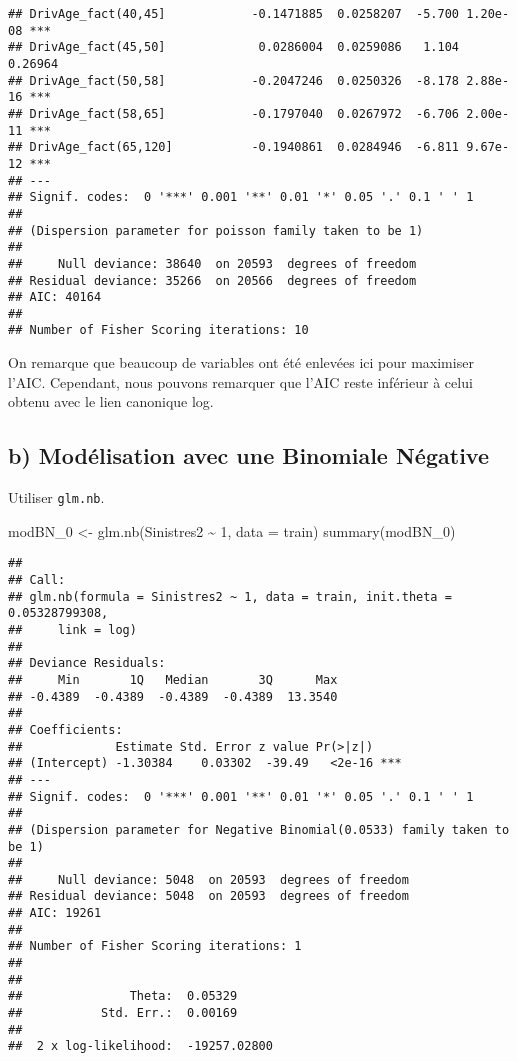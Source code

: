 \documentclass[
]{article}
\newenvironment{Shaded}{\begin{snugshade}}{\end{snugshade}}
\newcommand{\AttributeTok}[1]{\textcolor[rgb]{0.77,0.63,0.00}{#1}}
\newcommand{\DecValTok}[1]{\textcolor[rgb]{0.00,0.00,0.81}{#1}}
\newcommand{\FunctionTok}[1]{\textcolor[rgb]{0.00,0.00,0.00}{#1}}
\newcommand{\NormalTok}[1]{#1}
\newcommand{\OtherTok}[1]{\textcolor[rgb]{0.56,0.35,0.01}{#1}}
\newcommand{\SpecialCharTok}[1]{\textcolor[rgb]{0.00,0.00,0.00}{#1}}
\begin{document}
\begin{verbatim}
## DrivAge_fact(40,45]            -0.1471885  0.0258207  -5.700 1.20e-08 ***
## DrivAge_fact(45,50]             0.0286004  0.0259086   1.104  0.26964    
## DrivAge_fact(50,58]            -0.2047246  0.0250326  -8.178 2.88e-16 ***
## DrivAge_fact(58,65]            -0.1797040  0.0267972  -6.706 2.00e-11 ***
## DrivAge_fact(65,120]           -0.1940861  0.0284946  -6.811 9.67e-12 ***
## ---
## Signif. codes:  0 '***' 0.001 '**' 0.01 '*' 0.05 '.' 0.1 ' ' 1
## 
## (Dispersion parameter for poisson family taken to be 1)
## 
##     Null deviance: 38640  on 20593  degrees of freedom
## Residual deviance: 35266  on 20566  degrees of freedom
## AIC: 40164
## 
## Number of Fisher Scoring iterations: 10
\end{verbatim}

On remarque que beaucoup de variables ont été enlevées ici pour
maximiser l'AIC. Cependant, nous pouvons remarquer que l'AIC reste
inférieur à celui obtenu avec le lien canonique log.

\hypertarget{b-moduxe9lisation-avec-une-binomiale-nuxe9gative}{%
\subsection{b) Modélisation avec une Binomiale
Négative}\label{b-moduxe9lisation-avec-une-binomiale-nuxe9gative}}

Utiliser \texttt{glm.nb}.

\begin{Shaded}
\begin{Highlighting}[]
\NormalTok{modBN\_0 }\OtherTok{\textless{}{-}} \FunctionTok{glm.nb}\NormalTok{(Sinistres2 }\SpecialCharTok{\textasciitilde{}} \DecValTok{1}\NormalTok{, }\AttributeTok{data =}\NormalTok{ train)}
\FunctionTok{summary}\NormalTok{(modBN\_0)}
\end{Highlighting}
\end{Shaded}

\begin{verbatim}
## 
## Call:
## glm.nb(formula = Sinistres2 ~ 1, data = train, init.theta = 0.05328799308, 
##     link = log)
## 
## Deviance Residuals: 
##     Min       1Q   Median       3Q      Max  
## -0.4389  -0.4389  -0.4389  -0.4389  13.3540  
## 
## Coefficients:
##             Estimate Std. Error z value Pr(>|z|)    
## (Intercept) -1.30384    0.03302  -39.49   <2e-16 ***
## ---
## Signif. codes:  0 '***' 0.001 '**' 0.01 '*' 0.05 '.' 0.1 ' ' 1
## 
## (Dispersion parameter for Negative Binomial(0.0533) family taken to be 1)
## 
##     Null deviance: 5048  on 20593  degrees of freedom
## Residual deviance: 5048  on 20593  degrees of freedom
## AIC: 19261
## 
## Number of Fisher Scoring iterations: 1
## 
## 
##               Theta:  0.05329 
##           Std. Err.:  0.00169 
## 
##  2 x log-likelihood:  -19257.02800
\end{verbatim}
\end{document}
